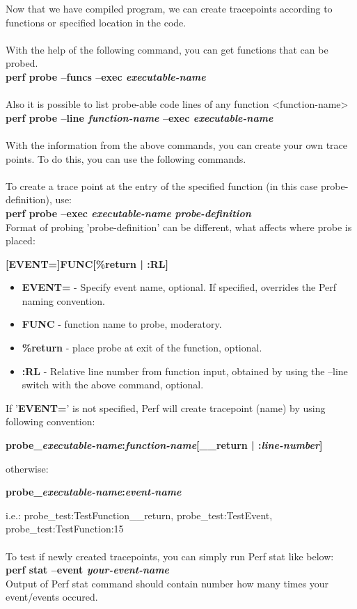 \documentclass[11pt,onecolumn]{article}
\begin{document}
Now that we have compiled program, we can create tracepoints according to functions or specified location in the code.\\\\
With the help of the following command, you can get functions that can be probed.\\
\quad\textbf{perf probe --funcs --exec \textit{executable-name}}\\\\
Also it is possible to list probe-able code lines of any function <function-name>\\
\textbf{perf probe --line \textit{function-name} --exec \textit{executable-name}}\\\\
With the information from the above commands, you can create your own trace points.
To do this, you can use the following commands.\\\\
To create a trace point at the entry of the specified function (in this case probe-definition), use:\\
\textbf{perf probe –exec \textit{executable-name} \textit{probe-definition}}\\
Format of probing 'probe-definition' can be different, what affects where probe is placed:
\begin{center}
	\textbf{[EVENT=]FUNC[\%return | :RL]}\newline
\end{center}
\begin{itemize}
	\item \textbf{EVENT=} - Specify event name, optional. If specified, overrides the Perf naming convention.
	\item \textbf{FUNC} - function name to probe, moderatory.
	\item \textbf{\%return} - place probe at exit of the function, optional.
	\item \textbf{:RL} - Relative line number from function input, obtained by using the --line switch with the above command, optional.
\end{itemize}
If '\textbf{EVENT=}' is not specified, Perf will create tracepoint (name) by using following convention:
\begin{center}
	\textbf{probe\_\textit{executable-name}:\textit{function-name}[\_\_return | :\textit{line-number}]}
\end{center}
otherwise:
\begin{center}
	\textbf{probe\_\textit{executable-name}:\textit{event-name}}
\end{center}
i.e.: probe\_test:TestFunction\_\_return, probe\_test:TestEvent, probe\_test:TestFunction:15\\\\
To test if newly created tracepoints, you can simply run Perf stat like below:\\
\textbf{perf stat --event \textit{your-event-name}}\\
Output of Perf stat command should contain number how many times your event/events occured.
\end{document}
